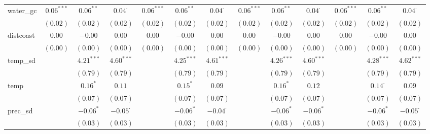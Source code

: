 \begin{sidewaystable}
\begin{center}
{\begin{tabular}{l c c c c c c c c c c c c}
water\_gc           & $0.06^{***}$  & $0.06^{**}$     & $0.04^{\cdot}$  & $0.06^{***}$  & $0.06^{**}$     & $0.04^{\cdot}$  & $0.06^{***}$  & $0.06^{**}$     & $0.04^{\cdot}$ & $0.06^{***}$    & $0.06^{**}$     & $0.04^{\cdot}$  \\
                    & $(0.02)$      & $(0.02)$        & $(0.02)$        & $(0.02)$      & $(0.02)$        & $(0.02)$        & $(0.02)$      & $(0.02)$        & $(0.02)$       & $(0.02)$        & $(0.02)$        & $(0.02)$        \\
distcoast           & $0.00$        & $-0.00$         & $0.00$          & $0.00$        & $-0.00$         & $0.00$          & $0.00$        & $-0.00$         & $0.00$         & $0.00$          & $-0.00$         & $0.00$          \\
                    & $(0.00)$      & $(0.00)$        & $(0.00)$        & $(0.00)$      & $(0.00)$        & $(0.00)$        & $(0.00)$      & $(0.00)$        & $(0.00)$       & $(0.00)$        & $(0.00)$        & $(0.00)$        \\
temp\_sd            &               & $4.21^{***}$    & $4.60^{***}$    &               & $4.25^{***}$    & $4.61^{***}$    &               & $4.26^{***}$    & $4.60^{***}$   &                 & $4.28^{***}$    & $4.62^{***}$    \\
                    &               & $(0.79)$        & $(0.79)$        &               & $(0.79)$        & $(0.79)$        &               & $(0.79)$        & $(0.79)$       &                 & $(0.79)$        & $(0.79)$        \\
temp                &               & $0.16^{*}$      & $0.11$          &               & $0.15^{*}$      & $0.09$          &               & $0.16^{*}$      & $0.12$         &                 & $0.14^{\cdot}$  & $0.09$          \\
                    &               & $(0.07)$        & $(0.07)$        &               & $(0.07)$        & $(0.07)$        &               & $(0.07)$        & $(0.07)$       &                 & $(0.07)$        & $(0.07)$        \\
prec\_sd            &               & $-0.06^{*}$     & $-0.05^{\cdot}$ &               & $-0.06^{*}$     & $-0.04^{\cdot}$ &               & $-0.06^{*}$     & $-0.06^{*}$    &                 & $-0.06^{*}$     & $-0.05^{\cdot}$ \\
                    &               & $(0.03)$        & $(0.03)$        &               & $(0.03)$        & $(0.03)$        &               & $(0.03)$        & $(0.03)$       &                 & $(0.03)$        & $(0.03)$        \\

\end{tabular}}
\end{center}
\end{sidewaystable}
